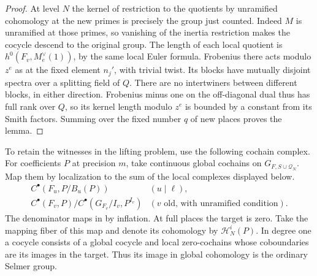 \documentclass[a4paper,11pt]{article}
\theoremstyle{definition}
\theoremstyle{remark}
\numberwithin{equation}{section}
\begin{document}
\begin{proof}
At level \(N\) the kernel of restriction to the quotients by
unramified cohomology at the new primes is precisely the
group just counted. Indeed \(M\) is unramified at those primes,
so vanishing of the inertia restriction makes the cocycle
descend to the original group. The length of each local
quotient is \(h^0(F_v,M_e^\vee(1))\), by the same local
Euler formula. Frobenius there acts modulo \(z^e\) as at the
fixed element \(n_j'\), with trivial twist. Its blocks have
mutually disjoint spectra over a splitting field of \(Q\).
There are no intertwiners between different blocks, in either
direction. Frobenius minus one on the off-diagonal dual thus
has full rank over \(Q\), so its kernel length modulo \(z^e\)
is bounded by a constant from its Smith factors. Summing
over the fixed number \(q\) of new places proves the lemma.
\end{proof}

To retain the witnesses in the lifting problem, use the
following cochain complex. For coefficients \(P\) at precision
\(m\), take continuous global cochains on
\(G_{F,S\cup\mathcal Q_N}\). Map them by localization to the
sum of the local complexes displayed below.
\[
 \begin{array}{ll}
 C^\bullet(F_u,P/B_u(P)) & (u\mid\ell),\\[2pt]
 C^\bullet(F_v,P)\big/
 C^\bullet(G_{F_v}/I_v,P^{I_v})
       & (v\text{ old, with unramified condition}).
 \end{array}
\]
The denominator maps in by inflation. At full places the
target is zero. Take the mapping fiber of this map and denote
its cohomology by \(\mathcal H^i_N(P)\). In degree one a
cocycle consists of a global cocycle and local zero-cochains
whose coboundaries are its images in the target. Thus its
image in global cohomology is the ordinary Selmer group.
\end{document}
